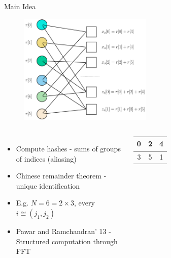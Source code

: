 \documentclass[10pt,xcolor=table]{beamer}
\begin{document}
\begin{frame}{Main Idea}
\begin{figure}[t]
\centering
\includegraphics[width=2.5in]{Factorgraph_example}
\end{figure}
\begin{columns}
\begin{itemize}
\item Compute hashes - sums of groups of indices (aliasing)
\item Chinese remainder theorem - unique identification
\item E.g. $N = 6 = 2 \times 3$, every $i \cong (j_1,j_2)$
\item Pawar and Ramchandran' 13 - Structured computation through FFT
\end{itemize}
\begin{tabular}{|c|c|c|}
  \hline
  0 & 2 & 4 \\
  \hline
  3 & 5 & 1 \\
  \hline
\end{tabular}
\end{columns}
\end{frame}
%	
%		
%		
%
\end{document}
